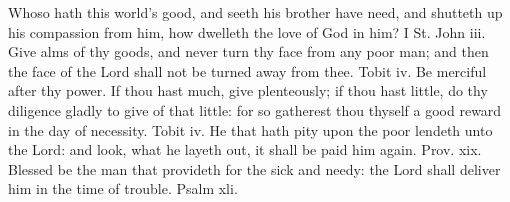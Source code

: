     Whoso hath this world's good, and seeth his brother have need, and shutteth up his compassion from him, how dwelleth the love of God in him? I St. John iii.
    Give alms of thy goods, and never turn thy face from any poor man; and then the face of the Lord shall not be turned away from thee. Tobit iv.
    Be merciful after thy power. If thou hast much, give plenteously; if thou hast little, do thy diligence gladly to give of that little: for so gatherest thou thyself a good reward in the day of necessity. Tobit iv.
    He that hath pity upon the poor lendeth unto the Lord: and look, what he layeth out, it shall be paid him again. Prov. xix.
    Blessed be the man that provideth for the sick and needy: the Lord shall deliver him in the time of trouble. Psalm xli.


